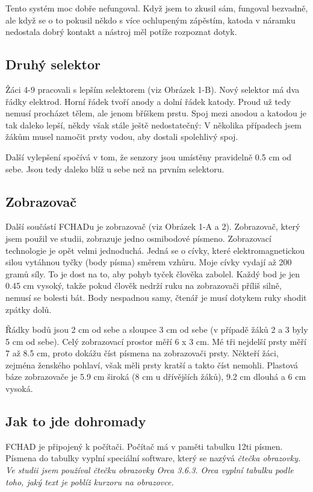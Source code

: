 Tento systém moc dobře nefungoval. Když jsem to zkusil sám, fungoval bezvadně, ale když se o to pokusil někdo s více ochlupeným zápěstím, katoda v náramku nedostala dobrý kontakt a nástroj měl potíže rozpoznat dotyk.

\subsection{Druhý selektor}

Žáci 4-9 pracovali s lepším selektorem (viz Obrázek 1-B). Nový selektor má dva řádky elektrod. Horní řádek tvoří anody a dolní řádek katody.  Proud už tedy nemusí procházet tělem, ale jenom bříškem prstu.  Spoj mezi anodou a katodou je tak daleko lepší, někdy však stále ještě nedostatečný: V několika případech jsem žákům musel namočit prsty vodou, aby dostali spolehlivý spoj.

Další vylepšení spočívá v tom, že senzory jsou umístěny pravidelně 0.5 cm od sebe.  Jsou tedy daleko blíž u sebe než na prvním selektoru.

\subsection{Zobrazovač}
Další součástí FCHADu je zobrazovač (viz Obrázek 1-A a 2).  Zobrazovač, který jsem použil ve studii, zobrazuje jedno osmibodové písmeno.  Zobrazovací technologie je opět velmi jednoduchá.  Jedná se o cívky, které elektromagnetickou silou vytáhnou tyčky (body písma) směrem vzhůru.  Moje cívky vydají až 200 gramů síly\citep{multicomp}.  To je dost na to, aby pohyb tyček člověka zabolel.  Každý bod je jen 0.45 cm vysoký, takže pokud člověk nedrží ruku na zobrazovači příliš silně, nemusí se bolesti bát.  Body nespadnou samy, čtenář je musí dotykem ruky shodit zpátky dolů.

Řádky bodů jsou 2 cm od sebe a sloupce 3 cm od sebe (v případě žáků 2 a 3 byly 5 cm od sebe).  Celý zobrazovací prostor měří 6 x 3 cm.  Mé tři nejdelší prsty měří 7 až 8.5 cm, proto dokážu číst písmena na zobrazovači prsty.  Někteří žáci, zejména ženského pohlaví, však měli prsty kratší a takto číst nemohli.  Plastová báze zobrazovače je 5.9 cm široká (8 cm u dřívějších žáků), 9.2 cm dlouhá a 6 cm vysoká.

\subsection{Jak to jde dohromady}

FCHAD je připojený k počítači. Počítač má v paměti tabulku 12ti písmen.  Písmena do tabulky vyplní speciální software, který se nazývá \em čtečka obrazovky\em .  Ve studii jsem používal čtečku obrazovky Orca 3.6.3. Orca vyplní tabulku podle toho, jaký text je poblíž kurzoru na obrazovce.

